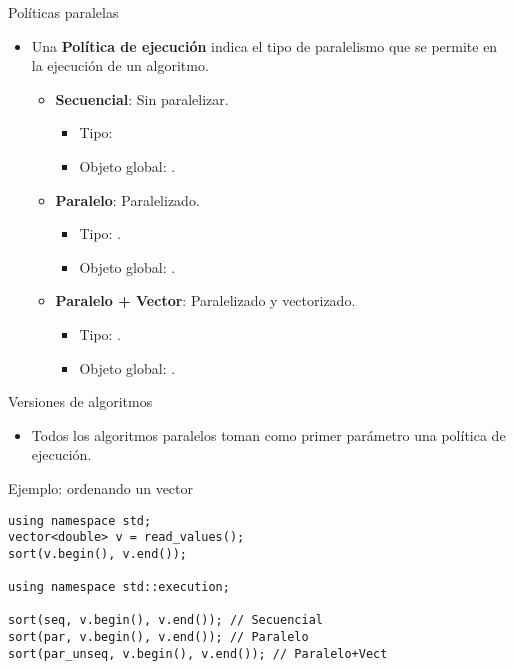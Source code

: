 \begin{frame}[t]{Políticas paralelas}
\begin{itemize}
  \item Una \textbf{Política de ejecución} indica el tipo de paralelismo
        que se permite en la ejecución de un algoritmo.
    \begin{itemize}
      \item \textbf{Secuencial}: Sin paralelizar.
        \begin{itemize}
          \item Tipo: 
          \item Objeto global: .
        \end{itemize}
      \item \textbf{Paralelo}: Paralelizado.
        \begin{itemize}
          \item Tipo: .
          \item Objeto global: .
        \end{itemize}
      \item \textbf{Paralelo + Vector}: Paralelizado y vectorizado.
        \begin{itemize}
          \item Tipo: .
          \item Objeto global: .
        \end{itemize}
    \end{itemize}
\end{itemize}
\end{frame}

\begin{frame}[t,fragile]{Versiones de algoritmos}
\begin{itemize}
  \item Todos los algoritmos paralelos toman como primer parámetro una política
        de ejecución.
\end{itemize}
\begin{block}{Ejemplo: ordenando un vector}
\begin{lstlisting}
using namespace std;
vector<double> v = read_values();
sort(v.begin(), v.end());

using namespace std::execution;

sort(seq, v.begin(), v.end()); // Secuencial
sort(par, v.begin(), v.end()); // Paralelo
sort(par_unseq, v.begin(), v.end()); // Paralelo+Vect
\end{lstlisting}
\end{block}
\end{frame}

